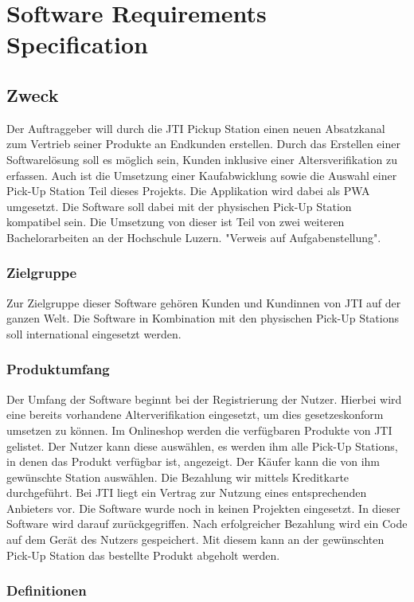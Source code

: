 \section{Software Requirements Specification}\label{RSR}


\subsection{Zweck}
Der Auftraggeber will durch die JTI Pickup Station einen neuen Absatzkanal zum Vertrieb seiner Produkte an Endkunden erstellen. Durch das Erstellen einer Softwarelösung soll es möglich sein, Kunden inklusive einer Altersverifikation zu erfassen. Auch ist die Umsetzung einer Kaufabwicklung sowie die Auswahl einer Pick-Up Station Teil dieses Projekts. Die Applikation wird dabei als \ac{PWA} umgesetzt. Die Software soll dabei mit der physischen Pick-Up Station kompatibel sein. Die Umsetzung von dieser ist Teil von zwei weiteren Bachelorarbeiten an der Hochschule Luzern.  
"Verweis auf Aufgabenstellung".
\subsubsection{Zielgruppe}
Zur Zielgruppe dieser Software gehören Kunden und Kundinnen von \ac{JTI} auf der ganzen Welt. Die Software in Kombination mit den physischen Pick-Up Stations soll international eingesetzt werden. 
\subsubsection{Produktumfang}
Der Umfang der Software beginnt bei der Registrierung der Nutzer. Hierbei wird eine bereits vorhandene Alterverifikation eingesetzt, um dies gesetzeskonform umsetzen zu können. Im Onlineshop werden die verfügbaren Produkte von \ac{JTI} gelistet. Der Nutzer kann diese auswählen, es werden ihm alle Pick-Up Stations, in denen das Produkt verfügbar ist, angezeigt. Der Käufer kann die von ihm gewünschte Station auswählen. Die Bezahlung wir mittels Kreditkarte durchgeführt. Bei JTI liegt ein Vertrag zur Nutzung eines entsprechenden Anbieters vor. Die Software wurde noch in keinen Projekten eingesetzt. In dieser Software wird darauf zurückgegriffen. Nach erfolgreicher Bezahlung wird ein Code auf dem Gerät des Nutzers gespeichert. Mit diesem kann an der gewünschten Pick-Up Station das bestellte Produkt abgeholt werden. 

\subsubsection{Definitionen}
